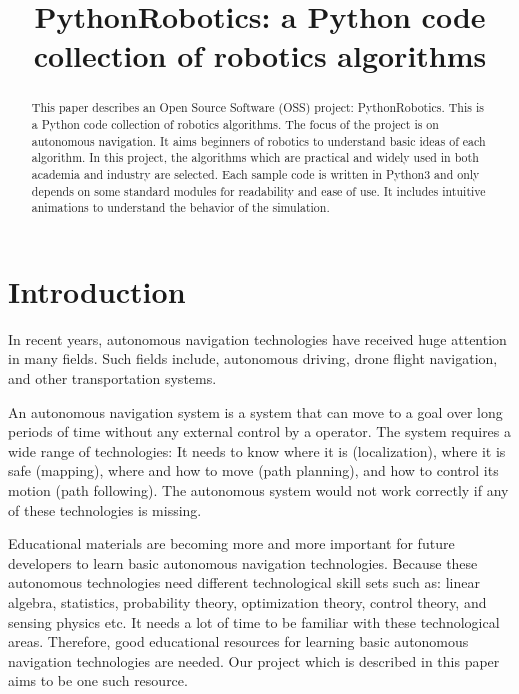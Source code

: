 \documentclass{bmvc2k}
\title{PythonRobotics: a Python code collection of robotics algorithms}
\begin{document}
\maketitle

\begin{abstract}
This paper describes an Open Source Software (OSS) project: PythonRobotics\cite{github}.
This is a Python code collection of robotics algorithms.
The focus of the project is on autonomous navigation.
It aims beginners of robotics to understand basic ideas of each algorithm.
In this project, the algorithms which are practical and widely used in both academia and industry are selected.
Each sample code is written in Python3 and only depends on some standard modules for readability and ease of use.
It includes intuitive animations to understand the behavior of the simulation.

\end{abstract}

\section{Introduction}

In recent years, autonomous navigation technologies have received huge attention in many fields. 
Such fields include, autonomous driving\cite{pathplanning}, drone flight navigation, and other transportation systems.

An autonomous navigation system is a system that can move to a goal over long periods of time without any external control by a operator.
The system requires a wide range of technologies:
It needs to know where it is (localization), where it is safe (mapping), where and how to move (path planning), and how to control its motion (path following). 
The autonomous system would not work correctly if any of these technologies is missing.

Educational materials are becoming more and more important for future developers to learn basic autonomous navigation technologies.
Because these autonomous technologies need different technological skill sets such as: linear algebra, statistics, probability theory, optimization theory, control theory, and sensing physics etc. 
It needs a lot of time to be familiar with these technological areas.
Therefore, good educational resources for learning basic autonomous navigation technologies are needed.
Our project which is described in this paper aims to be one such resource.
\end{document}
